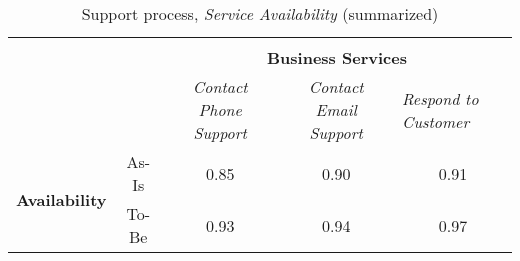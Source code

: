 \begin{table}[H]
\begin{tabular}{|c|c|p{2cm}|p{2.5cm}|p{2.5cm}|p{2.5cm}|}
		\multicolumn{6}{c}{} \\ \cline{3-6}
		\multicolumn{2}{c}{} & \multicolumn{4}{|c|}{\textbf{Business Services}} \\ \cline{3-6}
		\multicolumn{2}{c|}{} & \multicolumn{1}{|c|}{\textsl{Contact Phone Support}} & \multicolumn{2}{|c|}{\textsl{Contact Email Support}} & \multicolumn{1}{|p{2cm}|}{\textsl{Respond to Customer}}\\ \hline
		\multirow{2}{*}{\textbf{Availability}} & As-Is & \multicolumn{1}{|c|}{0.85} & \multicolumn{2}{|c|}{0.90} & \multicolumn{1}{|c|}{0.91}\\ \cline{2-6}
									   & To-Be &\multicolumn{1}{|c|}{0.93} & \multicolumn{2}{|c|}{0.94} & \multicolumn{1}{|c|}{0.97}\\ \hline
	\end{tabular}
\caption{Support process, \textsl{Service Availability} (summarized)} 
\label{tab:support_both}
\end{table}